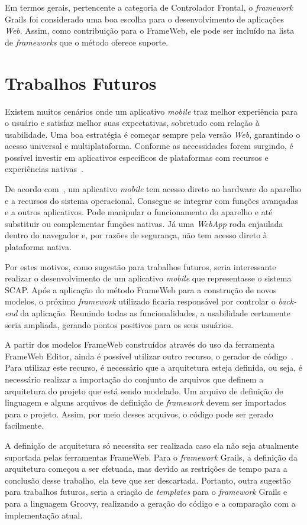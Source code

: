 Em termos gerais, pertencente a categoria de Controlador Frontal, o \textit{framework} Grails foi considerado uma boa escolha para o desenvolvimento de aplicações \textit{Web}. Assim, como contribuição para o FrameWeb, ele pode ser incluído na lista de \textit{frameworks} que o método oferece suporte.

\section{Trabalhos Futuros}
\label{sec-conclusoes-trabalhos-futuros}

Existem muitos cenários onde um aplicativo \textit{mobile} traz melhor experiência para o usuário e satisfaz melhor suas expectativas, sobretudo com relação à usabilidade. Uma boa estratégia é começar sempre pela versão \textit{Web}, garantindo o acesso universal e multiplataforma. Conforme as necessidades forem surgindo, é possível investir em aplicativos específicos de plataformas com recursos e experiências nativas~\cite{lopes:awm14}.

De acordo com~, um aplicativo \textit{mobile} tem acesso direto ao hardware do aparelho e a recursos do sistema operacional. Consegue se integrar com funções avançadas e a outros aplicativos. Pode manipular o funcionamento do aparelho e até substituir ou complementar funções nativas. Já uma \textit{WebApp} roda enjaulada dentro do navegador e, por razões de segurança, não tem acesso direto à plataforma nativa.

Por estes motivos, como sugestão para trabalhos futuros, seria interessante realizar o desenvolvimento de um aplicativo \textit{mobile} que representasse o sistema SCAP. Após a aplicação do método FrameWeb para a construção de novos modelos, o próximo \textit{framework} utilizado ficaria responsável por controlar o \textit{back-end} da aplicação. Reunindo todas as funcionalidades, a usabilidade certamente seria ampliada, gerando pontos positivos para os seus usuários.

A partir dos modelos FrameWeb construídos através do uso da ferramenta FrameWeb Editor, ainda é possível utilizar outro recurso, o gerador de código~\cite{almeida-et-al:webmedia17}. Para utilizar este recurso, é necessário que a arquitetura esteja definida, ou seja, é necessário realizar a importação do conjunto de arquivos que definem a arquitetura do projeto que está sendo modelado. Um arquivo de definição de linguagem e alguns arquivos de definição de \textit{framework} devem ser importados para o projeto. Assim, por meio desses arquivos, o código pode ser gerado facilmente.

A definição de arquitetura só necessita ser realizada caso ela não seja atualmente suportada pelas ferramentas FrameWeb. Para o \textit{framework} Grails, a definição da arquitetura começou a ser efetuada, mas devido as restrições de tempo para a conclusão desse trabalho, ela teve que ser descartada. Portanto, outra sugestão para trabalhos futuros, seria a criação de \textit{templates} para o \textit{framework} Grails e para a linguagem Groovy, realizando a geração do código e a comparação com a implementação atual.          

